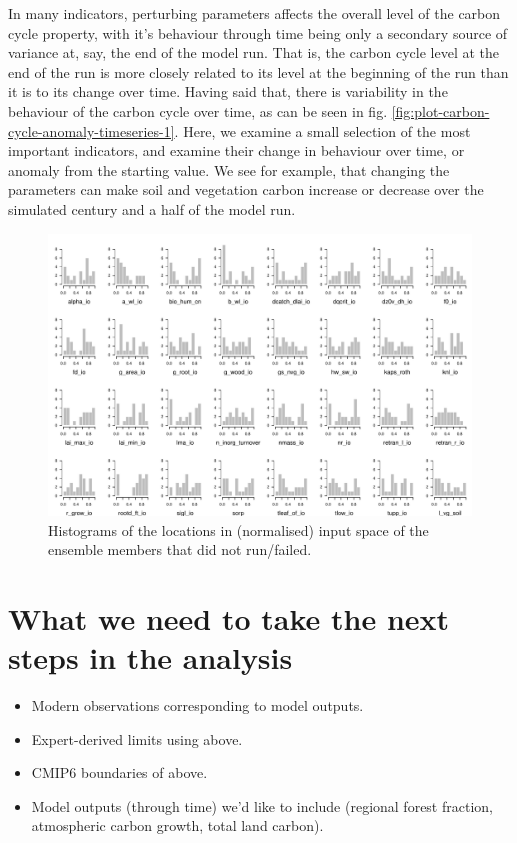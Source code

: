 \documentclass[gmd, manuscript]{copernicus}
\begin{document}
In many indicators, perturbing parameters affects the overall level of the carbon cycle property, with it's behaviour through time being only a secondary source of variance at, say, the end of the model run. That is, the carbon cycle level at the end of the run is more closely related to its level at the beginning of the run than it is to its change over time. Having said that, there is variability in the behaviour of the carbon cycle over time, as can be seen in fig. \ref{fig:plot-carbon-cycle-anomaly-timeseries-1}. Here, we examine a small selection of the most important indicators, and examine their change in behaviour over time, or anomaly from the starting value. We see for example, that changing the parameters can make soil and vegetation carbon increase or decrease over the simulated century and a half of the model run. 






\begin{figure}[t]
\includegraphics[width=12cm]{./graphics/run-failure-hists.pdf}
\caption{Histograms of the locations in (normalised) input space of the ensemble members that did not run/failed.}
\end{figure}









\section{What we need to take the next steps in the analysis}

\begin{itemize}
    \item Modern observations corresponding to model outputs.
    \item Expert-derived limits using above.
    \item CMIP6 boundaries of above.
    \item Model outputs (through time) we'd like to include (regional forest fraction, atmospheric carbon growth, total land carbon).
\end{itemize}
\end{document}
